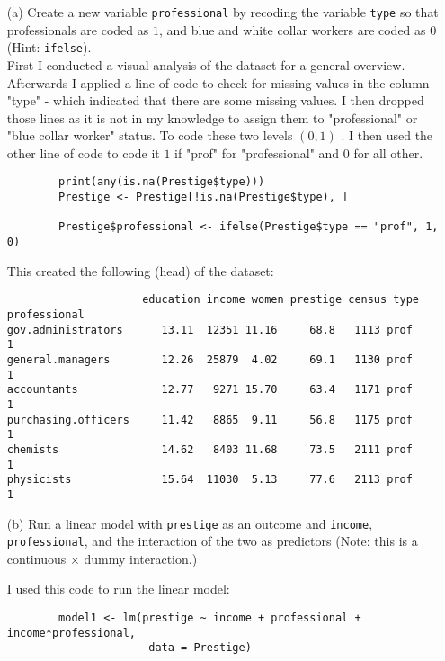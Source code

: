 \documentclass[12pt,letterpaper]{article}
\begin{document}
\newpage
\begin{enumerate}
	
	\item [(a)]
	Create a new variable \texttt{professional} by recoding the variable \texttt{type} so that professionals are coded as $1$, and blue and white collar workers are coded as $0$ (Hint: \texttt{ifelse}).\\
	
	First I conducted a visual analysis of the dataset for a general overview. Afterwards I applied a line of code to check for missing values in the column "type" - which indicated that there are some missing values. I then dropped those lines as it is not in my knowledge to assign them to "professional" or "blue collar worker" status. To code these two levels $(0, 1)$ . I then used the other line of code to code it $1$ if "prof" for "professional" and $0$ for all other.
	
	\begin{verbatim}
		print(any(is.na(Prestige$type)))
		Prestige <- Prestige[!is.na(Prestige$type), ] 
		
		Prestige$professional <- ifelse(Prestige$type == "prof", 1, 0)
	\end{verbatim}
	
	This created the following (head) of the dataset:
\begin{verbatim}
                     education income women prestige census type professional
gov.administrators      13.11  12351 11.16     68.8   1113 prof            1
general.managers        12.26  25879  4.02     69.1   1130 prof            1
accountants             12.77   9271 15.70     63.4   1171 prof            1
purchasing.officers     11.42   8865  9.11     56.8   1175 prof            1
chemists                14.62   8403 11.68     73.5   2111 prof            1
physicists              15.64  11030  5.13     77.6   2113 prof            1
\end{verbatim}

	\vspace{.2cm}
	
	
	\item [(b)]
	Run a linear model with \texttt{prestige} as an outcome and \texttt{income}, \texttt{professional}, and the interaction of the two as predictors (Note: this is a continuous $\times$ dummy interaction.)
	
	I used this code to run the linear model:
	
	\begin{verbatim}
		model1 <- lm(prestige ~ income + professional + income*professional,
		              data = Prestige)
	\end{verbatim}


\end{enumerate}
\end{document}
